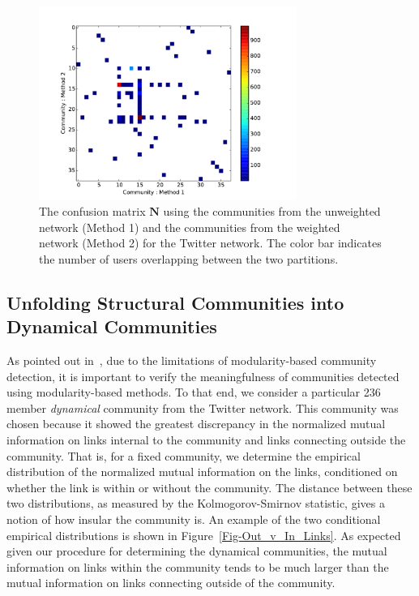 \documentclass[12pt]{article}
\begin{document}
\begin{figure}[h!]
  \centering
\includegraphics[width=0.75\textwidth]{Figures/confusion_matrix.pdf}
\caption{The confusion matrix $\mathbf{N}$ using the communities from the unweighted network (Method 1) and the communities from the weighted network (Method 2) for the Twitter network. The color bar indicates the number of users overlapping between the two partitions.}
\label{Fig-Confusion_Matrix_Twitter}
\end{figure}

\subsection{Unfolding Structural Communities into Dynamical Communities}

As pointed out in~\cite{good2010performance}, due to the limitations of modularity-based community detection, it is important to verify the meaningfulness of communities detected using modularity-based methods. To that end, we consider a particular 236 member \emph{dynamical} community from the Twitter network. This community was chosen because it showed the greatest discrepancy in the normalized mutual information on links internal to the community and links connecting outside the community. That is, for a fixed community, we determine the empirical distribution of the normalized mutual information on the links, conditioned on whether the link is within or without the community. The distance between these two distributions, as measured by the Kolmogorov-Smirnov statistic, gives a notion of how insular the community is. An example of the two conditional empirical distributions is shown in Figure~\ref{Fig-Out_v_In_Links}. As expected given our procedure for determining the dynamical communities, the mutual information on links within the community tends to be much larger than the mutual information on links connecting outside of the community.
\end{document}
